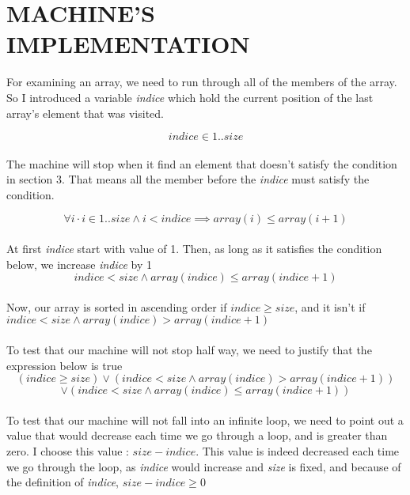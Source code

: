 \section{MACHINE'S IMPLEMENTATION}

For examining an array, we need to run through all of the members of the array. So I introduced a variable \textit{indice} which hold the current position of the last array's element that was visited.

$$ indice \in 1..size $$

\paragraph{}
The machine will stop when it find an element that doesn't satisfy the condition in section 3. That means all the member before the \textit{indice} must satisfy the condition.

$$ \forall i \cdot i \in 1..size \land i < indice \implies array(i) \leq array(i+1) $$

\paragraph{}
At first \textit{indice} start with value of 1. Then, as long as it satisfies the condition below, we increase \textit{indice} by 1
$$ indice < size \land array(indice) \leq array(indice+1) $$

\paragraph{}
Now, our array is sorted in ascending order if $ indice \geq size $, and it isn't if $ indice < size \land array(indice) > array(indice+1) $

\paragraph{}
To test that our machine will not stop half way, we need to justify that the expression below is true
$$ (indice \geq size) \lor (indice < size \land array(indice) > array(indice+1)) $$
$$ \lor (indice < size \land array(indice) \leq array(indice+1)) $$ 

\paragraph{}
To test that our machine will not fall into an infinite loop, we need to point out a value that would decrease each time we go through a loop, and is greater than zero. I choose this value : $size - indice$. This value is indeed decreased each time we go through the loop, as \textit{indice} would increase and \textit{size} is fixed, and because of the definition of \textit{indice}, $size - indice \geq 0$